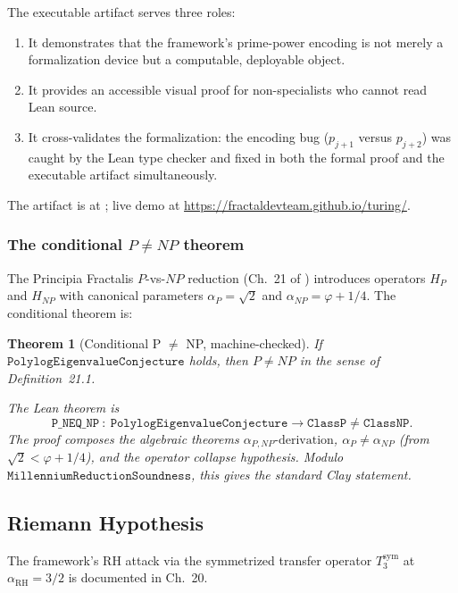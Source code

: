 \documentclass[11pt,a4paper]{article}
\newtheorem{theorem}{Theorem}[section]
\theoremstyle{definition}
\theoremstyle{remark}
\begin{document}
The executable artifact serves three roles:
\begin{enumerate}
\item It demonstrates that the framework's prime-power encoding is not
merely a formalization device but a computable, deployable object.
\item It provides an accessible visual proof for non-specialists who
cannot read Lean source.
\item It cross-validates the formalization: the encoding bug
(\texttt{$p_{j+1}$} versus \texttt{$p_{j+2}$}) was caught by the Lean
type checker and fixed in both the formal proof and the executable
artifact simultaneously.
\end{enumerate}

The artifact is at \cite{cohen2026turing}; live demo at
\url{https://fractaldevteam.github.io/turing/}.

\subsubsection*{The conditional $P \neq NP$ theorem}

The Principia Fractalis $P$-vs-$NP$ reduction (Ch.~21 of
\cite{cohen2025framework}) introduces operators $H_P$ and $H_{NP}$ with
canonical parameters $\alpha_P = \sqrt{2}$ and $\alpha_{NP} = \varphi
+ 1/4$. The conditional theorem is:

\begin{theorem}[Conditional P $\neq$ NP, machine-checked]
\label{thm:p-neq-np}
If $\mathtt{PolylogEigenvalueConjecture}$ holds, then $P \neq NP$ in
the sense of \cite{cohen2025framework} Definition~21.1.

The Lean theorem is
\[
\mathtt{P\_NEQ\_NP\ :\ PolylogEigenvalueConjecture \to ClassP \neq ClassNP}.
\]
The proof composes the algebraic theorems
$\alpha_{P,NP}\text{-derivation}$, $\alpha_{P} \neq \alpha_{NP}$
(from $\sqrt{2} < \varphi + 1/4$), and the operator collapse hypothesis.
Modulo $\mathtt{MillenniumReductionSoundness}$, this gives the standard
Clay statement.
\end{theorem}

\subsection{Riemann Hypothesis}

The framework's RH attack via the symmetrized transfer operator
$T_3^{\mathrm{sym}}$ at $\alpha_{\mathrm{RH}} = 3/2$ is documented in
\cite{cohen2025framework} Ch.~20.
\end{document}
